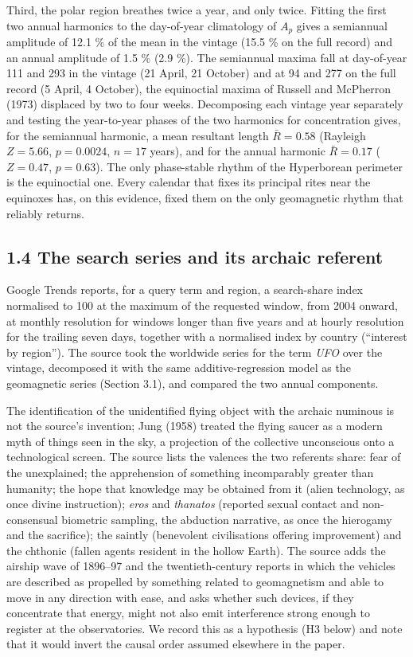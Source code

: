 \documentclass[
  10pt,
  a4paper,
]{article}
\begin{document}
Third, the polar region breathes twice a year, and only twice. Fitting
the first two annual harmonics to the day-of-year climatology of \(A_p\)
gives a semiannual amplitude of 12.1 \% of the mean in the vintage (15.5
\% on the full record) and an annual amplitude of 1.5 \% (2.9 \%). The
semiannual maxima fall at day-of-year 111 and 293 in the vintage (21
April, 21 October) and at 94 and 277 on the full record (5 April, 4
October), the equinoctial maxima of Russell and McPherron (1973)
displaced by two to four weeks. Decomposing each vintage year separately
and testing the year-to-year phases of the two harmonics for
concentration gives, for the semiannual harmonic, a mean resultant
length \(\bar R = 0.58\) (Rayleigh \(Z = 5.66\), \(p = 0.0024\),
\(n = 17\) years), and for the annual harmonic \(\bar R = 0.17\)
(\(Z = 0.47\), \(p = 0.63\)). The only phase-stable rhythm of the
Hyperborean perimeter is the equinoctial one. Every calendar that fixes
its principal rites near the equinoxes has, on this evidence, fixed them
on the only geomagnetic rhythm that reliably returns.

\hypertarget{the-search-series-and-its-archaic-referent}{%
\subsection{1.4 The search series and its archaic
referent}\label{the-search-series-and-its-archaic-referent}}

Google Trends reports, for a query term and region, a search-share index
normalised to 100 at the maximum of the requested window, from 2004
onward, at monthly resolution for windows longer than five years and at
hourly resolution for the trailing seven days, together with a
normalised index by country (``interest by region''). The source took
the worldwide series for the term \emph{UFO} over the vintage,
decomposed it with the same additive-regression model as the geomagnetic
series (Section 3.1), and compared the two annual components.

The identification of the unidentified flying object with the archaic
numinous is not the source's invention; Jung (1958) treated the flying
saucer as a modern myth of things seen in the sky, a projection of the
collective unconscious onto a technological screen. The source lists the
valences the two referents share: fear of the unexplained; the
apprehension of something incomparably greater than humanity; the hope
that knowledge may be obtained from it (alien technology, as once divine
instruction); \emph{eros} and \emph{thanatos} (reported sexual contact
and non-consensual biometric sampling, the abduction narrative, as once
the hierogamy and the sacrifice); the saintly (benevolent civilisations
offering improvement) and the chthonic (fallen agents resident in the
hollow Earth). The source adds the airship wave of 1896--97 and the
twentieth-century reports in which the vehicles are described as
propelled by something related to geomagnetism and able to move in any
direction with ease, and asks whether such devices, if they concentrate
that energy, might not also emit interference strong enough to register
at the observatories. We record this as a hypothesis (H3 below) and note
that it would invert the causal order assumed elsewhere in the paper.
\end{document}
